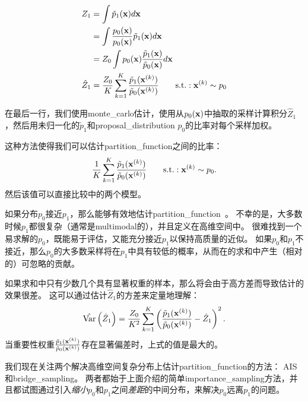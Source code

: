 
\begin{align}
	Z_1 &= \int \tilde{p}_1 (\mathbf{x}) d \mathbf{x} \\
	&= \int  \frac{ p_0(\mathbf{x}) }{ p_0(\mathbf{x}) }   \tilde{p}_1 (\mathbf{x}) d \mathbf{x} \\
	&= Z_0 \int  p_0(\mathbf{x})   \frac{ \tilde{p}_1 (\mathbf{x}) }{ \tilde{p}_0 (\mathbf{x}) } d \mathbf{x} \\
	\hat{Z}_1 &= \frac{Z_0}{K} \sum_{k=1}^K \frac{ \tilde{p}_1(\mathbf{x}^{(k)})  }{ \tilde{p}_0(\mathbf{x}^{(k)}) }  \quad\quad \text{s.t.}: \mathbf{x}^{(k)} \sim p_0 \label{eq:18.44}
\end{align}

在最后一行，我们使用\gls{monte_carlo}估计，使用从$p_0(\mathbf{x})$中抽取的采样计算积分$\hat{Z}_1$，然后用未归一化的$\tilde{p}_1$和\gls{proposal_distribution} $p_0$的比率对每个采样加权。


这种方法使得我们可以估计\gls{partition_function}之间的比率：
\begin{equation}
	\frac{1}{K} \sum_{k=1}^K \frac{ \tilde{p}_1 (\mathbf{x}^{(k)}) }{ \tilde{p}_0 (\mathbf{x}^{(k)}) }
	\quad\quad \text{s.t.}: \mathbf{x}^{(k)} \sim p_0.
\end{equation}
然后该值可以直接比较中的两个模型。


如果分布$p_0$接近$p_1$，那么能够有效地估计\gls{partition_function}~\citep{Minka_2005}。
不幸的是，大多数时候$p_1$都很复杂（通常是\gls{multimodal}的），并且定义在高维空间中。
很难找到一个易求解的$p_0$，既能易于评估，又能充分接近$p_1$以保持高质量的近似。
如果$p_0$和$p_1$不接近，那么$p_0$的大多数采样将在$p_1$中具有较低的概率，从而在的求和中产生（相对的）可忽略的贡献。


如果求和中只有少数几个具有显著权重的样本，那么将会由于高方差而导致估计的效果很差。
这可以通过估计$\hat{Z}_1$的方差来定量地理解：
\begin{equation}
	\hat{\text{Var}} \left( \hat{Z}_1 \right)  = \frac{Z_0 }{K^2} \sum_{k=1}^K
\left(  \frac{ \tilde{p}_1(\mathbf{x}^{(k)}) }{  \tilde{p}_0(\mathbf{x}^{(k)}) } - \hat{Z}_1  \right)^2.
\end{equation}
当重要性权重$\frac{ \tilde{p}_1(\mathbf{x}^{(k)}) }{ \tilde{p}_0(\mathbf{x}^{(k)}) } $存在显著偏差时，上式的值是最大的。


我们现在关注两个解决高维空间复杂分布上估计\gls{partition_function}的方法：
\gls{AIS}和\gls{bridge_sampling}。
两者都始于上面介绍的简单\gls{importance_sampling}方法，并且都试图通过引入\emph{缩小}$p_0$和$p_1$之间\emph{差距}的中间分布，来解决$p_0$远离$p_1$的问题。


